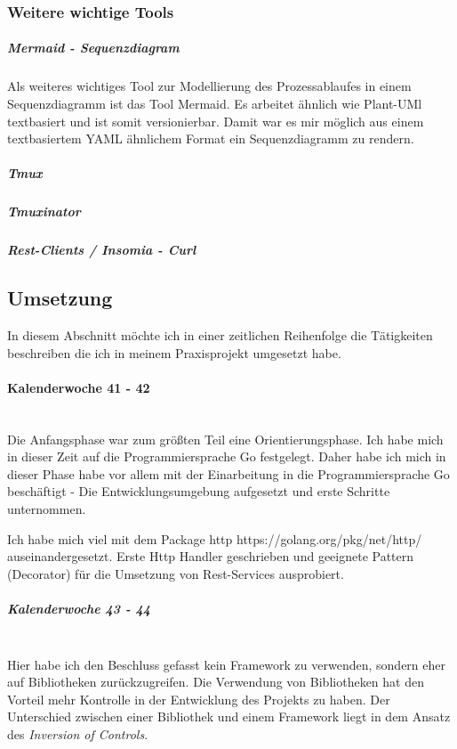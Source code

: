 \documentclass[12pt]{article}
\begin{document}
\subsubsection{Weitere wichtige Tools}

\subparagraph{Mermaid - Sequenzdiagram}

Als weiteres wichtiges Tool zur Modellierung des Prozessablaufes in einem Sequenzdiagramm ist das Tool Mermaid. Es arbeitet ähnlich wie Plant-UMl textbasiert und ist somit versionierbar. Damit war es mir möglich aus einem textbasiertem YAML ähnlichem Format ein Sequenzdiagramm zu rendern.

\subparagraph{Tmux}

\subparagraph{Tmuxinator}
\subparagraph{Rest-Clients / Insomia - Curl}

\newpage
\subsection{Umsetzung}

In diesem Abschnitt möchte ich in einer zeitlichen Reihenfolge die Tätigkeiten beschreiben die ich in meinem Praxisprojekt umgesetzt habe.

\paragraph{Kalenderwoche 41 - 42}\mbox{}\\

Die Anfangsphase war zum größten Teil eine Orientierungsphase. Ich habe mich in dieser Zeit auf die Programmiersprache Go festgelegt. Daher habe ich mich in dieser Phase habe vor allem mit der Einarbeitung in die Programmiersprache Go beschäftigt - Die Entwicklungsumgebung aufgesetzt und erste Schritte unternommen.

Ich habe mich viel mit dem Package http https://golang.org/pkg/net/http/ auseinandergesetzt. Erste Http Handler geschrieben und geeignete Pattern (Decorator) für die Umsetzung von Rest-Services ausprobiert.

\subparagraph{Kalenderwoche 43 - 44}\mbox{}\\

Hier habe ich den Beschluss gefasst kein Framework zu verwenden, sondern eher auf Bibliotheken zurückzugreifen. Die Verwendung von Bibliotheken hat den Vorteil mehr Kontrolle in der Entwicklung des Projekts zu haben. Der Unterschied zwischen einer Bibliothek und einem Framework liegt in dem Ansatz des \textit{Inversion of Controls}.
\end{document}
